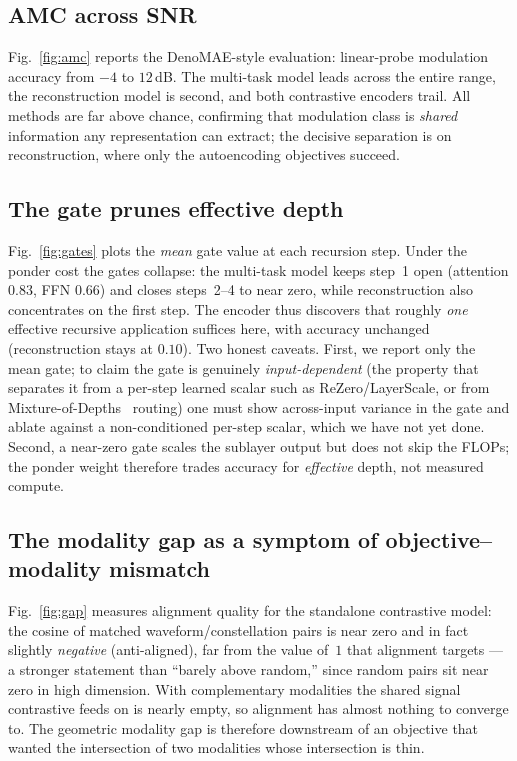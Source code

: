 \documentclass[conference]{IEEEtran}
\begin{document}
\subsection{AMC across SNR}
Fig.~\ref{fig:amc} reports the DenoMAE-style evaluation: linear-probe modulation
accuracy from $-4$ to $12$\,dB. The multi-task model leads across the entire range,
the reconstruction model is second, and both contrastive encoders trail. All
methods are far above chance, confirming that modulation class is \emph{shared}
information any representation can extract; the decisive separation is on
reconstruction, where only the autoencoding objectives succeed.

\subsection{The gate prunes effective depth}
\label{sec:gate}
Fig.~\ref{fig:gates} plots the \emph{mean} gate value at each recursion step. Under
the ponder cost the gates collapse: the multi-task model keeps step~1 open
(attention $0.83$, FFN $0.66$) and closes steps~2--4 to near zero, while
reconstruction also concentrates on the first step. The encoder thus discovers that
roughly \emph{one} effective recursive application suffices here, with accuracy
unchanged (reconstruction stays at $0.10$). Two honest caveats. First, we report
only the mean gate; to claim the gate is genuinely \emph{input-dependent} (the
property that separates it from a per-step learned scalar such as
ReZero/LayerScale, or from Mixture-of-Depths~\cite{mod} routing) one must show
across-input variance in the gate and ablate against a non-conditioned per-step
scalar, which we have not yet done. Second, a near-zero gate scales the sublayer
output but does not skip the FLOPs; the ponder weight therefore trades accuracy for
\emph{effective} depth, not measured compute.

\subsection{The modality gap as a symptom of objective--modality mismatch}
\label{sec:gap}
Fig.~\ref{fig:gap} measures alignment quality for the standalone contrastive model:
the cosine of matched waveform/constellation pairs is near zero and in fact slightly
\emph{negative} (anti-aligned), far from the value of~$1$ that alignment targets ---
a stronger statement than ``barely above random,'' since random pairs sit near zero
in high dimension. With complementary modalities the shared signal contrastive feeds
on is nearly empty, so alignment has almost nothing to converge to. The geometric
modality gap is therefore downstream of an objective that wanted the intersection of
two modalities whose intersection is thin.
\end{document}
